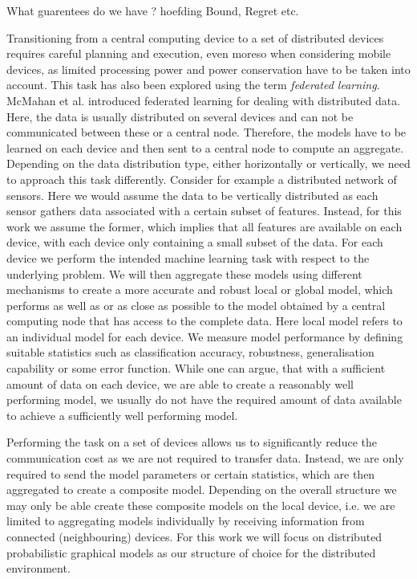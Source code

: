 What guarentees do we have ? 
hoefding Bound, Regret etc.

Transitioning from a central computing device to a set of distributed devices requires careful planning and execution, even moreso when considering mobile devices, as limited processing power and power conservation have to be taken into account.
This task has also been explored using the term \textit{federated learning}.
McMahan et al. \cite{mcmahan2016communication} introduced federated learning for dealing with distributed data.
Here, the data is usually distributed on several devices and can not be communicated between these or a central node. 
Therefore, the models have to be learned on each device and then sent to a central node to compute an aggregate.
Depending on the data distribution type, either horizontally or vertically, we need to approach this task differently. 
Consider for example a distributed network of sensors.
Here we would assume the data to be vertically distributed as each sensor gathers data associated with a certain subset of features.
Instead, for this work we assume the former, which implies that all features are available on each device, with each device only containing a small subset of the data.
For each device we perform the intended machine learning task with respect to the underlying problem.
We will then aggregate these models using different mechanisms to create a more accurate and robust local or global model, which performs as well as or as close as possible to the model obtained by a central computing node that has access to the complete data.
Here local model refers to an individual model for each device.
We measure model performance by defining suitable statistics such as classification accuracy, robustness, generalisation capability or some error function.
While one can argue, that with a sufficient amount of data on each device, we are able to create a reasonably well performing model, we usually do not have the required amount of data available to achieve a sufficiently well performing model.

Performing the task on a set of devices allows us to significantly reduce the communication cost as we are not required to transfer data.
Instead, we are only required to send the model parameters or certain statistics, which are then aggregated to create a composite model.
Depending on the overall structure we may only be able create these composite models on the local device, i.e. we are limited to aggregating models individually by receiving information from connected (neighbouring) devices.
For this work we will focus on distributed probabilistic graphical models as our structure of choice for the distributed environment.

